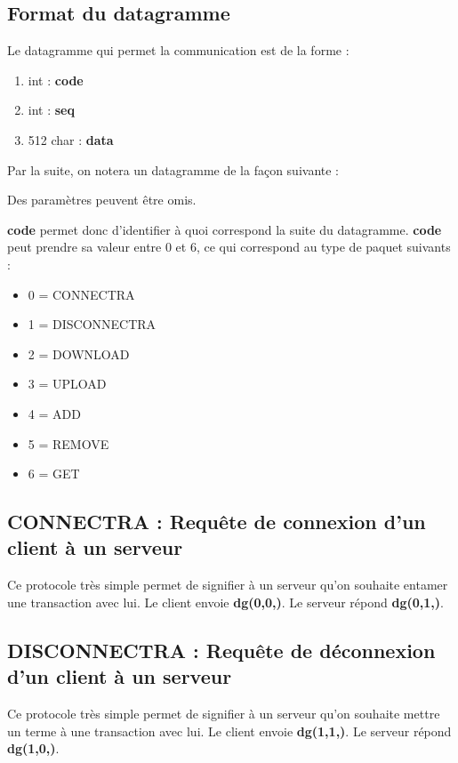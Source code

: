 \documentclass[10pt,a4paper]{article}
\begin{document}
\subsection{Format du datagramme}

Le datagramme qui permet la communication est de la forme :
\begin{enumerate}
 \item int : \textbf{code}
 \item int : \textbf{seq}
 \item 512 char : \textbf{data}
\end{enumerate}

Par la suite, on notera un datagramme de la façon suivante :

\begin{center}
\end{center}

Des paramètres peuvent être omis.

\vspace{0.3cm}
\textbf{code} permet donc d'identifier à quoi correspond la suite du datagramme.
\textbf{code} peut prendre sa valeur entre 0 et 6, ce qui correspond au type de paquet suivants :
\begin{itemize}
 \item 0 = CONNECTRA
 \item 1 = DISCONNECTRA
 \item 2 = DOWNLOAD
 \item 3 = UPLOAD
 \item 4 = ADD
 \item 5 = REMOVE
 \item 6 = GET
\end{itemize}

\subsection{CONNECTRA : Requête de connexion d'un client à un serveur}
Ce protocole très simple permet de signifier à un serveur qu'on souhaite entamer une transaction avec lui.
Le client envoie \textbf{dg(0,0,)}. Le serveur répond \textbf{dg(0,1,)}.

\subsection{DISCONNECTRA : Requête de déconnexion d'un client à un serveur}
Ce protocole très simple permet de signifier à un serveur qu'on souhaite mettre un terme à une transaction avec lui.
Le client envoie \textbf{dg(1,1,)}. Le serveur répond \textbf{dg(1,0,)}.
\end{document}
